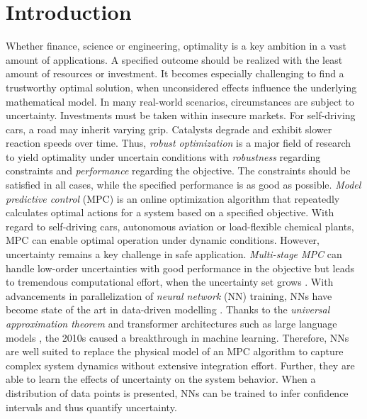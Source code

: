 \chapter{Introduction}\label{intro} 


Whether finance, science or engineering, optimality is a key ambition in
a vast amount of applications. A specified outcome should be realized with the least amount
of resources or investment. It becomes especially challenging to 
find a trustworthy optimal solution, when unconsidered effects influence the underlying mathematical model.
In many real-world scenarios, circumstances are subject to uncertainty. 
Investments must be taken within insecure markets.
For self-driving cars, a road may inherit varying grip. 
Catalysts degrade and exhibit slower reaction speeds over time.
Thus, \emph{robust optimization} is a major field of research to yield optimality under
uncertain conditions with \emph{robustness} regarding constraints and \emph{performance} regarding the objective. 
The constraints should be satisfied in all cases, while the specified performance
is as good as possible.
\newline
\newline
\noindent
\emph{Model predictive control} (MPC) is an online optimization algorithm that repeatedly 
calculates optimal actions for a system based on a specified objective. With regard to
self-driving cars, autonomous aviation or load-flexible chemical plants, MPC can enable
optimal operation under dynamic conditions. However, uncertainty remains a key challenge
in safe application. \emph{Multi-stage MPC} can handle low-order uncertainties with good performance
in the objective but leads to tremendous computational effort, when the uncertainty set grows \cite{lucia2013}.
\newline
\newline
\noindent
With advancements in parallelization of \emph{neural network} (NN) training, NNs have become
state of the art in data-driven modelling \cite{mcbride2019}. Thanks to the \emph{universal approximation theorem}
\cite{hornik1990} and transformer architectures such as large language models \cite{vaswani2023},
the 2010s caused a breakthrough in machine learning. Therefore, NNs are well suited to replace the physical model
of an MPC algorithm to capture complex system dynamics without extensive integration effort.
Further, they are able to learn the effects of uncertainty on the system behavior. When a distribution
of data points is presented, NNs can be trained to infer confidence intervals and thus quantify uncertainty.
